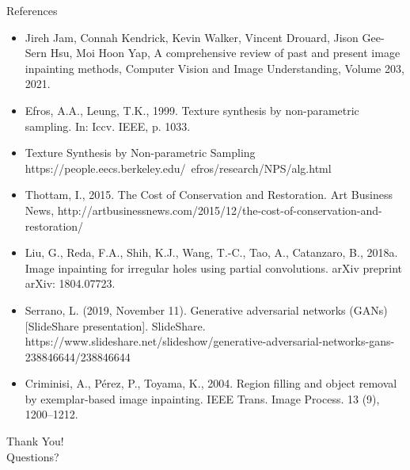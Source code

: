 \documentclass{beamer}
\begin{document}
\begin{frame}{References}
\scriptsize
    \begin{itemize}
            \item Jireh Jam, Connah Kendrick, Kevin Walker, Vincent Drouard, Jison Gee-Sern Hsu, Moi Hoon Yap,
A comprehensive review of past and present image inpainting methods,
Computer Vision and Image Understanding,
Volume 203,
2021.
            \item  Efros, A.A., Leung, T.K., 1999. Texture synthesis by non-parametric sampling. In: Iccv.
 IEEE, p. 1033.
    \item Texture Synthesis by Non-parametric Sampling https://people.eecs.berkeley.edu/~efros/research/NPS/alg.html
    \item  Thottam, I., 2015. The Cost of Conservation and Restoration. Art Business News,
 http://artbusinessnews.com/2015/12/the-cost-of-conservation-and-restoration/
 \item  Liu, G., Reda, F.A., Shih, K.J., Wang, T.-C., Tao, A., Catanzaro, B., 2018a. Image
 inpainting for irregular holes using partial convolutions. arXiv preprint arXiv: 1804.07723.
 \item Serrano, L. (2019, November 11). Generative adversarial networks (GANs) [SlideShare presentation]. SlideShare. https://www.slideshare.net/slideshow/generative-adversarial-networks-gans-238846644/238846644
 \item  Criminisi, A., Pérez, P., Toyama, K., 2004. Region filling and object removal by
 exemplar-based image inpainting. IEEE Trans. Image Process. 13 (9), 1200–1212.
        \end{itemize}
        
\end{frame}


\begin{frame}{}
    \centering
    \Huge{Thank You!}
    \vspace{1cm}
    \\ \Large{Questions?}
\end{frame}
\end{document}
